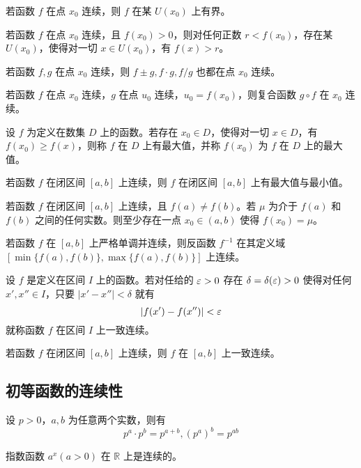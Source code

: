 \begin{theorem}[局部有界性]
	若函数 $f$ 在点 $x_0$ 连续，则 $f$ 在某 $U(x_0)$ 上有界。
\end{theorem}

\begin{theorem}[局部保号性]
	若函数 $f$ 在点 $x_0$ 连续，且 $f(x_0)>0$，则对任何正数 $r<f(x_0)$，存在某 $U(x_0)$，使得对一切 $x\in U(x_0)$，有 $f(x)>r$。
\end{theorem}

\begin{theorem}[四则运算]
	若函数 $f,g$ 在点 $x_0$ 连续，则 $f\pm g,f\cdot g,f/g$ 也都在点 $x_0$ 连续。
\end{theorem}

\begin{theorem}
	若函数 $f$ 在点 $x_0$ 连续，$g$ 在点 $u_0$ 连续，$u_0=f(x_0)$，则复合函数 $g\circ f$ 在 $x_0$ 连续。
\end{theorem}

\begin{definition}
	设 $f$ 为定义在数集 $D$ 上的函数。若存在 $x_0\in D$，使得对一切 $x\in D$，有 $f(x_0)\ge f(x)$，则称 $f$ 在 $D$ 上有最大值，并称 $f(x_0)$ 为 $f$ 在 $D$ 上的最大值。
\end{definition}

\begin{theorem}[最大、最小值定理]
	若函数 $f$ 在闭区间 $[a,b]$ 上连续，则 $f$ 在闭区间 $[a,b]$ 上有最大值与最小值。
\end{theorem}

\begin{theorem}[介值定理]
	若函数 $f$ 在闭区间 $[a,b]$ 上连续，且 $f(a)\ne f(b)$。若 $\mu$ 为介于 $f(a)$ 和 $f(b)$ 之间的任何实数。则至少存在一点 $x_0\in (a,b)$ 使得 $f(x_0)=\mu$。
\end{theorem}

\begin{theorem}
	若函数 $f$ 在 $[a,b]$ 上严格单调并连续，则反函数 $f^{-1}$ 在其定义域 $[\min\{f(a),f(b)\},\max\{f(a),f(b)\}]$ 上连续。
\end{theorem}

\begin{definition}
	设 $f$ 是定义在区间 $I$ 上的函数。若对任给的 $\varepsilon>0$ 存在 $\delta=\delta(\varepsilon)>0$ 使得对任何 $x',x''\in I$，只要 $|x'-x''|<\delta$ 就有
	\[ |f(x')-f(x'')|<\varepsilon \]
	就称函数 $f$ 在区间 $I$ 上一致连续。
\end{definition}

\begin{theorem}[一致连续性]
	若函数 $f$ 在闭区间 $[a,b]$ 上连续，则 $f$ 在 $[a,b]$ 上一致连续。
\end{theorem}

\subsection{初等函数的连续性}

\begin{theorem}
	设 $p>0$，$a,b$ 为任意两个实数，则有
	\[ p^a\cdot p^b = p^{a+b},(p^a)^b=p^{ab} \]
\end{theorem}

\begin{theorem}
	指数函数 $a^x(a>0)$ 在 $\mathbb{R}$ 上是连续的。
\end{theorem}


